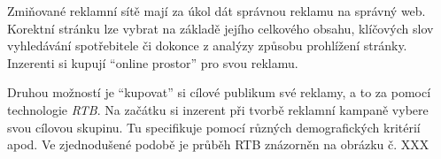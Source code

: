     Zmiňované reklamní sítě mají za úkol dát správnou reklamu na správný web.
    Korektní stránku lze vybrat na základě jejího celkového obsahu, klíčových slov vyhledávání spotřebitele či dokonce z analýzy způsobu prohlížení stránky.
    Inzerenti si kupují \enquote{online prostor} pro svou reklamu. 

    Druhou možností je \enquote{kupovat} si cílové publikum své reklamy, a to za pomocí technologie \emph{RTB}.
    Na začátku si inzerent při tvorbě reklamní kampaně vybere svou cílovou skupinu. Tu specifikuje pomocí různých demografických kritérií apod.
    Ve zjednodušené podobě je průběh RTB znázorněn na obrázku č. XXX

\endinput